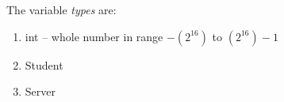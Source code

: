 The variable \emph{types} are:
\begin{enumerate}
	\item int -- whole number in range $-(2^{16})$ to $(2^{16})-1$
	\item Student
	\item Server
\end{enumerate}
